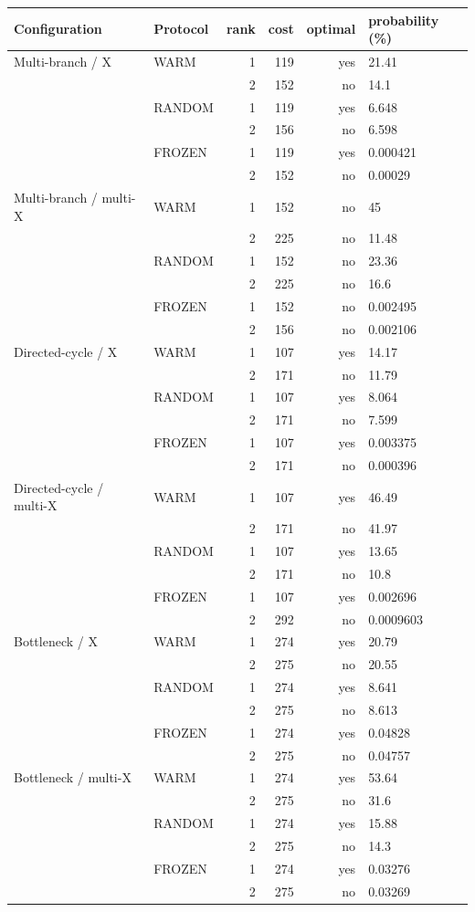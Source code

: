 \begin{tabular}{llrrrl}
\toprule
Configuration & Protocol & rank & cost & optimal & probability (\%) \\
\midrule
Multi-branch / X & WARM & 1 & 119 & yes & 21.41 \\
 &  & 2 & 152 & no & 14.1 \\
 & RANDOM & 1 & 119 & yes & 6.648 \\
 &  & 2 & 156 & no & 6.598 \\
 & FROZEN & 1 & 119 & yes & 0.000421 \\
 &  & 2 & 152 & no & 0.00029 \\
Multi-branch / multi-X & WARM & 1 & 152 & no & 45 \\
 &  & 2 & 225 & no & 11.48 \\
 & RANDOM & 1 & 152 & no & 23.36 \\
 &  & 2 & 225 & no & 16.6 \\
 & FROZEN & 1 & 152 & no & 0.002495 \\
 &  & 2 & 156 & no & 0.002106 \\
Directed-cycle / X & WARM & 1 & 107 & yes & 14.17 \\
 &  & 2 & 171 & no & 11.79 \\
 & RANDOM & 1 & 107 & yes & 8.064 \\
 &  & 2 & 171 & no & 7.599 \\
 & FROZEN & 1 & 107 & yes & 0.003375 \\
 &  & 2 & 171 & no & 0.000396 \\
Directed-cycle / multi-X & WARM & 1 & 107 & yes & 46.49 \\
 &  & 2 & 171 & no & 41.97 \\
 & RANDOM & 1 & 107 & yes & 13.65 \\
 &  & 2 & 171 & no & 10.8 \\
 & FROZEN & 1 & 107 & yes & 0.002696 \\
 &  & 2 & 292 & no & 0.0009603 \\
Bottleneck / X & WARM & 1 & 274 & yes & 20.79 \\
 &  & 2 & 275 & no & 20.55 \\
 & RANDOM & 1 & 274 & yes & 8.641 \\
 &  & 2 & 275 & no & 8.613 \\
 & FROZEN & 1 & 274 & yes & 0.04828 \\
 &  & 2 & 275 & no & 0.04757 \\
Bottleneck / multi-X & WARM & 1 & 274 & yes & 53.64 \\
 &  & 2 & 275 & no & 31.6 \\
 & RANDOM & 1 & 274 & yes & 15.88 \\
 &  & 2 & 275 & no & 14.3 \\
 & FROZEN & 1 & 274 & yes & 0.03276 \\
 &  & 2 & 275 & no & 0.03269 \\
\bottomrule
\end{tabular}

